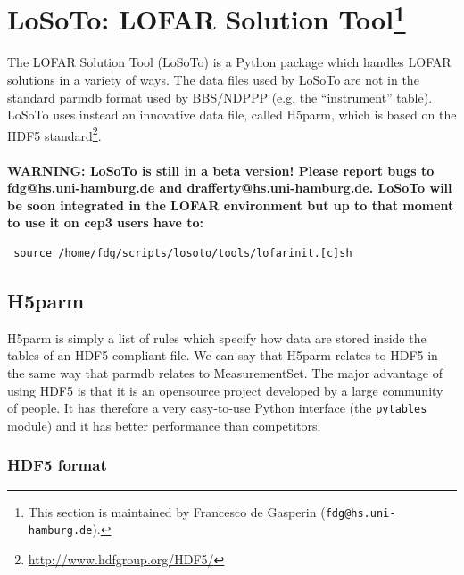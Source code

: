 \documentclass[]{article}
\begin{document}

\def \losoto {LoSoTo}

\section[LoSoTo: LOFAR Solution Tool]{\losoto: LOFAR Solution Tool\footnote{This section is maintained by Francesco de Gasperin ({\tt fdg@hs.uni-hamburg.de}).}}
\label{losoto}

The LOFAR Solution Tool (\losoto{}) is a Python package which handles LOFAR solutions in a variety of ways. The data files used by \losoto{} are not in the standard parmdb format used by BBS/NDPPP (e.g. the ``instrument'' table). \losoto{} uses instead an innovative data file, called H5parm, which is based on the HDF5 standard\footnote{\url{http://www.hdfgroup.org/HDF5/}}.
\\
\\
\textbf{WARNING: \losoto{} is still in a beta version! Please report bugs to fdg@hs.uni-hamburg.de and drafferty@hs.uni-hamburg.de. \losoto{} will be soon integrated in the LOFAR environment but up to that moment to use it on cep3 users have to:}
\begin{verbatim}
 source /home/fdg/scripts/losoto/tools/lofarinit.[c]sh
\end{verbatim}

\subsection{H5parm}
\label{losoto:h5parm}

H5parm is simply a list of rules which specify how data are stored inside the tables of an HDF5 compliant file. We can say that H5parm relates to HDF5 in the same way that parmdb relates to MeasurementSet. The major advantage of using HDF5 is that it is an opensource project developed by a large community of people. It has therefore a very easy-to-use Python interface (the \texttt{pytables} module) and it has better performance than competitors.

\subsubsection{HDF5 format}
\label{losoto:HDF5}
\end{document}
